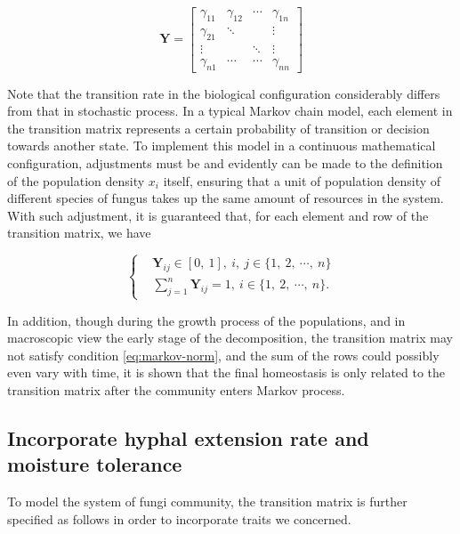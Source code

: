 \begin{equation}
    \boldsymbol{Y} =
    \begin{bmatrix}
        \gamma_{11} & \gamma_{12} & \cdots & \gamma_{1n} \\
        \gamma_{21} & \ddots & & \vdots \\
        \vdots & & \ddots & \vdots \\
        \gamma_{n1} & \cdots & \cdots & \gamma_{nn}
    \end{bmatrix}
\end{equation}

Note that the transition rate in the biological configuration considerably differs from that in stochastic process. In a typical Markov chain model, each element in the transition matrix represents a certain probability of transition or decision towards another state. To implement this model in a continuous mathematical configuration, adjustments must be and evidently can be made to the definition of the population density $x_i$ itself, ensuring that a unit of population density of different species of fungus takes up the same amount of resources in the system. With such adjustment, it is guaranteed that, for each element and row of the transition matrix, we have

\begin{equation}\label{eq:markov-norm}
    \left\{\begin{aligned} &
        \boldsymbol{Y}_{ij} \in [0,\ 1],\ i,\ j\in\{1,\ 2,\ \cdots,\ n\} \\ &
        \sum_{j=1}^n \boldsymbol{Y}_{ij} = 1,\ i\in\{1,\ 2,\ \cdots,\ n\}.
    \end{aligned}\right.
\end{equation}

In addition, though during the growth process of the populations, and in macroscopic view the early stage of the decomposition, the transition matrix may not satisfy condition \eqref{eq:markov-norm}, and the sum of the rows could possibly even vary with time, it is shown that the final homeostasis is only related to the transition matrix after the community enters Markov process.


\subsection{Incorporate hyphal extension rate and moisture tolerance}

To model the system of fungi community, the transition matrix is further specified as follows in order to incorporate traits we concerned.

